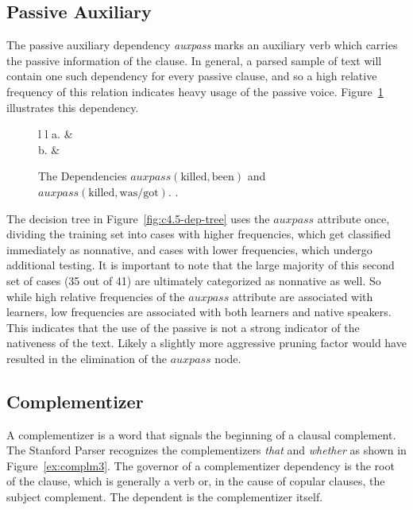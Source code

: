 \documentclass[main.tex]{subfiles}
\begin{document}
\subsection{Passive Auxiliary}

The passive auxiliary dependency \textit{auxpass} marks an auxiliary verb which carries the passive information of the clause. In general, a parsed sample of text will contain one such dependency for every passive clause, and so a high relative frequency of this relation indicates heavy usage of the passive voice. Figure~\ref{ex:auxpass-dep} illustrates this dependency.

\begin{figure}[htbp]
\centering
\begin{tabular}{ l l }
a. & \\
b. & 
\end{tabular}
\caption{The Dependencies $auxpass(\text{killed},\text{been})$ and $auxpass(\text{killed},\text{was/got})$. \citep{typed-deps-manual}.}
\label{ex:auxpass-dep}
\end{figure}

The decision tree in Figure~\ref{fig:c4.5-dep-tree} uses the $auxpass$ attribute once, dividing the training set into cases with higher frequencies, which get classified immediately as nonnative, and cases with lower frequencies, which undergo additional testing. It is important to note that the large majority of this second set of cases (35 out of 41) are ultimately categorized as nonnative as well. So while high relative frequencies of the $auxpass$ attribute are associated with learners, low frequencies are associated with both learners and native speakers. This indicates that the use of the passive is not a strong indicator of the nativeness of the text. Likely a slightly more aggressive pruning factor would have resulted in the elimination of the $auxpass$ node.

\subsection{Complementizer}

A complementizer is a word that signals the beginning of a clausal complement. The Stanford Parser recognizes the complementizers \textit{that} and \textit{whether} as shown in Figure~\ref{ex:complm3}. The governor of a complementizer dependency is the root of the clause, which is generally a verb or, in the cause of copular clauses, the subject complement. The dependent is the complementizer itself.
\end{document}
